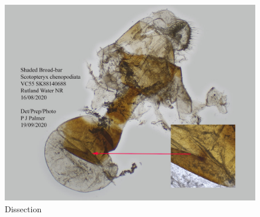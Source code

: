 \documentclass[]{article}
\begin{document}
\begin{figure}
	\centering
	\includegraphics[width=0.7\linewidth]{202009131026PJP-3}
	\caption{Dissection}
	\label{fig:202009131026pjp-3}
\end{figure}


%



\end{document}
